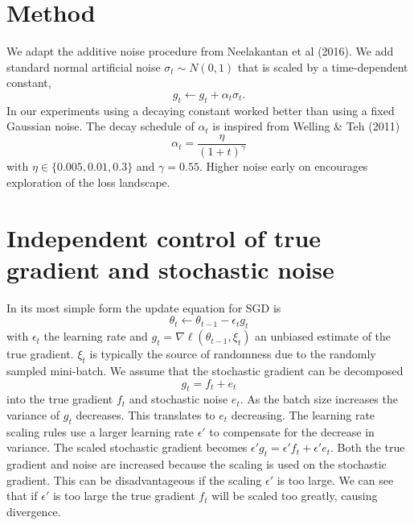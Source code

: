 \documentclass{article} %
\begin{document}
\section{Method}
We adapt the additive noise procedure from Neelakantan et al (2016).
We add standard normal artificial noise $\sigma_t \sim N (0 , 1)$ that is scaled by a time-dependent constant,
\begin{equation}
\label{eq:artificial_noise}
g_t \gets g_t +  \alpha_t \sigma_t.
\end{equation}
In our experiments using a decaying constant worked better than using a fixed Gaussian noise.
The decay schedule of $\alpha_t$ is inspired from Welling \& Teh (2011)
\begin{equation}
\label{eq:artificial_noise_scale}
\alpha_t = \frac{\eta}{(1 + t)^\gamma}
\end{equation}
with $\eta \in \{ 0.005, 0.01, 0.3 \}$ and $\gamma = 0.55$.
Higher noise early on encourages exploration of the loss landscape.

\section{Independent control of true gradient and stochastic noise}
In its most simple form the update equation for SGD is
\begin{equation*}
\theta_t \gets \theta_{t-1} - \epsilon_t g_t
\end{equation*}
with $\epsilon_t$ the learning rate and $g_t = \nabla \ell ( \theta_{t-1}, \xi_t )$ an unbiased estimate of the true gradient.
$\xi_t$ is typically the source of randomness due to the randomly sampled mini-batch.
We assume that the stochastic gradient can be decomposed
\begin{equation*}
g_t = f_t + e_t
\end{equation*}
into the true gradient $f_t$ and stochastic noise $e_t$.
As the batch size increases the variance of $g_t$ decreases.
This translates to $e_t$ decreasing.
The learning rate scaling rules use a larger learning rate $\epsilon'$ to compensate for the decrease in variance.
The scaled stochastic gradient becomes $\epsilon' g_t = \epsilon' f_t + \epsilon' e_t$.
Both the true gradient and noise are increased because the scaling is used on the stochastic gradient.
This can be disadvantageous if the scaling $\epsilon'$ is too large.
We can see that if $\epsilon'$ is too large the true gradient $f_t$ will be scaled too greatly, causing divergence.
\end{document}
